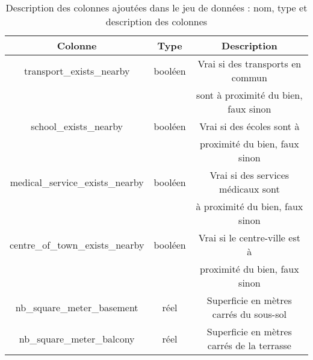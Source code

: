\documentclass[a4paper, 12pt, twoside]{report}
\begin{document}
		\begin{table}[h]
			\begin{center}
				\begin{tabular}{|c|c|c|}
				\hline
				{\bf Colonne} & {\bf Type} & {\bf Description} \\
				\hline 
				transport\_exists\_nearby & booléen & Vrai si des transports en commun \\ 
				& & sont à proximité du bien, faux sinon \\ 
				\hline 
				school\_exists\_nearby & booléen & Vrai si des écoles sont à \\ 
				& & proximité du bien, faux sinon \\ 
				\hline 
				medical\_service\_exists\_nearby & booléen & Vrai si des services médicaux sont \\ 
				& & à proximité du bien, faux sinon \\ 
				\hline 
				centre\_of\_town\_exists\_nearby & booléen & Vrai si le centre-ville est à \\ 
				& & proximité du bien, faux sinon \\ 
				\hline 
				nb\_square\_meter\_basement & réel & Superficie en mètres carrés du sous-sol \\ 
				\hline 
				nb\_square\_meter\_balcony & réel & Superficie en mètres carrés de la terrasse \\ 
				\hline 
				\end{tabular} 
			\end{center}
			\label{tabColonnesAjoutees}
			\caption{Description des colonnes ajoutées dans le jeu de données : nom, type et description des colonnes}
		\end{table}
\end{document}

